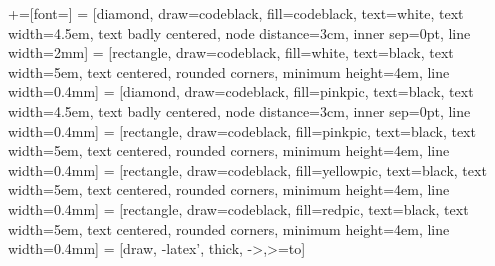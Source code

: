 +=[font=\small\sffamily]
\usetikzlibrary{shapes,arrows}
 = [diamond, draw=codeblack, fill=codeblack, text=white,
    text width=4.5em, text badly centered, node distance=3cm, inner sep=0pt,
    line width=2mm]
 = [rectangle, draw=codeblack, fill=white,  text=black,
    text width=5em, text centered, rounded corners, minimum height=4em,
    line width=0.4mm]
 = [diamond, draw=codeblack, fill=pinkpic, text=black,
    text width=4.5em, text badly centered, node distance=3cm, inner sep=0pt,
    line width=0.4mm]
 = [rectangle, draw=codeblack, fill=pinkpic,  text=black,
    text width=5em, text centered, rounded corners, minimum height=4em,
    line width=0.4mm]
 = [rectangle, draw=codeblack, fill=yellowpic,  text=black,
    text width=5em, text centered, rounded corners, minimum height=4em,
    line width=0.4mm]
 = [rectangle, draw=codeblack, fill=redpic,  text=black,
    text width=5em, text centered, rounded corners, minimum height=4em,
    line width=0.4mm]
 = [draw, -latex', thick, ->,>=to]
